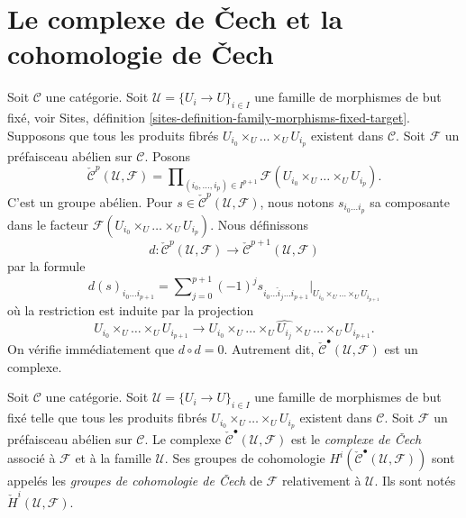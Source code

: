 \section{Le complexe de {\v C}ech et la cohomologie de {\v C}ech}
\label{section-cech}

\noindent
Soit $\mathcal{C}$ une catégorie. Soit $\mathcal{U} = \{U_i \to U\}_{i \in I}$
une famille de morphismes de but fixé, voir
Sites, définition \ref{sites-definition-family-morphisms-fixed-target}.
Supposons que tous les produits fibrés $U_{i_0} \times_U \ldots \times_U U_{i_p}$
existent dans $\mathcal{C}$. Soit $\mathcal{F}$ un préfaisceau abélien sur
$\mathcal{C}$. Posons
$$
\check{\mathcal{C}}^p(\mathcal{U}, \mathcal{F})
=
\prod\nolimits_{(i_0, \ldots, i_p) \in I^{p + 1}}
\mathcal{F}(U_{i_0} \times_U \ldots \times_U U_{i_p}).
$$
C'est un groupe abélien. Pour
$s \in \check{\mathcal{C}}^p(\mathcal{U}, \mathcal{F})$, nous notons
$s_{i_0\ldots i_p}$ sa composante dans le facteur
$\mathcal{F}(U_{i_0} \times_U \ldots \times_U U_{i_p})$.
Nous définissons
$$
d : \check{\mathcal{C}}^p(\mathcal{U}, \mathcal{F})
\longrightarrow
\check{\mathcal{C}}^{p + 1}(\mathcal{U}, \mathcal{F})
$$
par la formule
\begin{equation}
\label{equation-d-cech}
d(s)_{i_0\ldots i_{p + 1}} =
\sum\nolimits_{j = 0}^{p + 1}
(-1)^j s_{i_0\ldots \hat i_j \ldots i_{p + 1}}
|_{U_{i_0} \times_U \ldots \times_U U_{i_{p + 1}}}
\end{equation}
où la restriction est induite par la projection
$$
U_{i_0} \times_U \ldots \times_U U_{i_{p + 1}} \longrightarrow
U_{i_0} \times_U \ldots \times_U \widehat{U_{i_j}} \times_U
\ldots \times_U U_{i_{p + 1}}.
$$
On vérifie immédiatement que $d \circ d = 0$. Autrement dit,
$\check{\mathcal{C}}^\bullet(\mathcal{U}, \mathcal{F})$ est un complexe.

\begin{definition}
\label{definition-cech-complex}
Soit $\mathcal{C}$ une catégorie. Soit $\mathcal{U} = \{U_i \to U\}_{i \in I}$
une famille de morphismes de but fixé telle que tous les produits fibrés
$U_{i_0} \times_U \ldots \times_U U_{i_p}$ existent dans $\mathcal{C}$.
Soit $\mathcal{F}$ un préfaisceau abélien sur $\mathcal{C}$.
Le complexe $\check{\mathcal{C}}^\bullet(\mathcal{U}, \mathcal{F})$
est le {\it complexe de {\v C}ech} associé à $\mathcal{F}$ et à la
famille $\mathcal{U}$. Ses groupes de cohomologie
$H^i(\check{\mathcal{C}}^\bullet(\mathcal{U}, \mathcal{F}))$ sont
appelés les {\it groupes de cohomologie de {\v C}ech} de $\mathcal{F}$ relativement
à $\mathcal{U}$. Ils sont notés $\check H^i(\mathcal{U}, \mathcal{F})$.
\end{definition}

